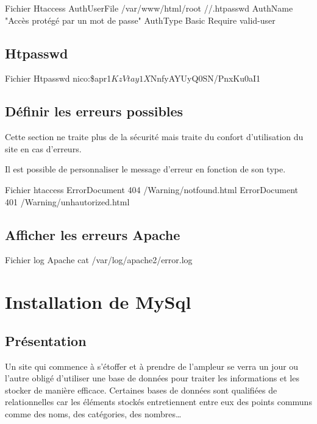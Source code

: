 {\begin{Bash}{Fichier Htaccess}
AuthUserFile /var/www/html/root	//.htpasswd
AuthName "Accès protégé par un mot de passe"
AuthType Basic
Require valid-user
\end{Bash}

\section{Htpasswd}
\begin{Bash}{Fichier Htpasswd}
nico:\$apr1$KzVtay1X$NnfyAYUyQ0SN/PnxKu0aI1

\end{Bash}

\section{Définir les erreurs possibles}

Cette section ne traite plus de la sécurité mais traite du confort d’utilisation du site en cas d’erreurs.

Il est possible de personnaliser le message d’erreur en fonction de son type.

\begin{Bash}{Fichier htaccess}
ErrorDocument 404 /Warning/notfound.html
ErrorDocument 401 /Warning/unhautorized.html
\end{Bash}

\section{Afficher les erreurs Apache}
\begin{Bash}{Fichier log Apache}
cat /var/log/apache2/error.log 
\end{Bash}
\chapter{Installation de MySql}

\section{Présentation}
Un site qui commence à s’étoffer et à prendre de l’ampleur se verra un jour ou l’autre obligé d’utiliser une base de données pour traiter les informations et les stocker de manière efficace. 
Certaines  bases de données sont qualifiées de relationnelles car les éléments stockés entretiennent entre eux des points communs comme des noms, des catégories, des nombres… \\

}
